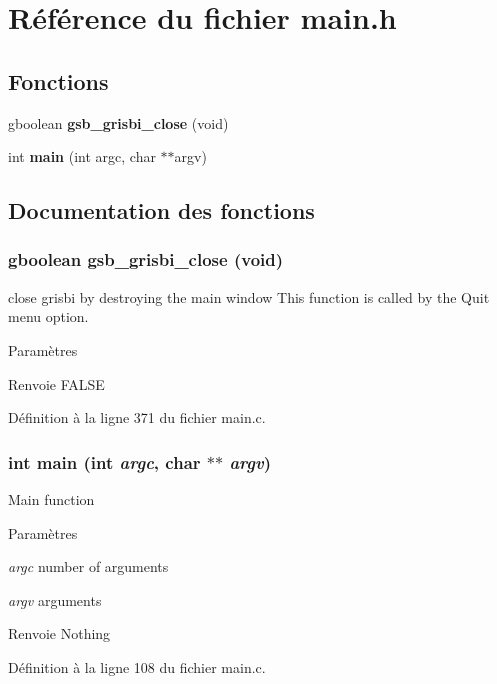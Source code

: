\section{Référence du fichier main.h}
\label{main_8h}
\subsection*{Fonctions}
\begin{DoxyCompactItemize}
\item 
gboolean {\bf gsb\_\-grisbi\_\-close} (void)
\item 
int {\bf main} (int argc, char $\ast$$\ast$argv)
\end{DoxyCompactItemize}


\subsection{Documentation des fonctions}
\subsubsection[{gsb\_\-grisbi\_\-close}]{\setlength{\rightskip}{0pt plus 5cm}gboolean gsb\_\-grisbi\_\-close (void)}\label{main_8h_a4d6c21c259d467499784d537bccb61e5}
close grisbi by destroying the main window This function is called by the Quit menu option.


\begin{DoxyParams}{Paramètres}
\item[{\em }]\end{DoxyParams}
\begin{DoxyReturn}{Renvoie}
FALSE 
\end{DoxyReturn}


Définition à la ligne 371 du fichier main.c.

\subsubsection[{main}]{\setlength{\rightskip}{0pt plus 5cm}int main (int {\em argc}, \/  char $\ast$$\ast$ {\em argv})}\label{main_8h_a3c04138a5bfe5d72780bb7e82a18e627}
Main function


\begin{DoxyParams}{Paramètres}
\item[{\em argc}]number of arguments \item[{\em argv}]arguments\end{DoxyParams}
\begin{DoxyReturn}{Renvoie}
Nothing 
\end{DoxyReturn}


Définition à la ligne 108 du fichier main.c.

